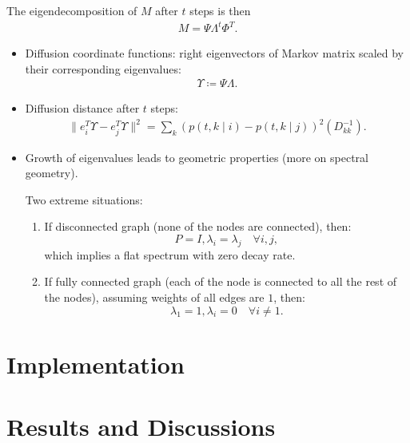 \begin{enumerate}
    The eigendecomposition of $M$ after $t$ steps is then
    \begin{align}
        M = \Psi \Lambda^t \Phi^T.
    \end{align}
    
    \begin{itemize}
        \item Diffusion coordinate functions: right eigenvectors of Markov matrix scaled by their corresponding eigenvalues: 
        \begin{align}
            \Upsilon \coloneqq \Psi \Lambda.
        \end{align}
        \item Diffusion distance after $t$ steps: 
       \begin{align}
            \| e_i^T  \Upsilon - e_j^T \Upsilon  \|^2 = \sum_{k} (p(t,k\mid i) - p(t,k\mid j))^2 (D_{k k}^{-1}).
       \end{align}
       
       \item Growth of eigenvalues leads to geometric properties (more on spectral geometry).
       
       Two extreme situations:
       \begin{enumerate}
           \item If disconnected graph (none of the nodes are connected), then:
           \[P = I, \lambda_i = \lambda_j \quad \forall i, j, \]
           which implies a flat spectrum with zero decay rate.
           \item If fully connected graph (each of the node is connected to all the rest of the nodes), assuming weights of all edges are $1$, then:
            \[\lambda_1 = 1, \lambda_i = 0 \quad \forall i \neq 1.\]
       \end{enumerate}
    \end{itemize}
\end{enumerate}

\section{Implementation}

\section{Results and Discussions}